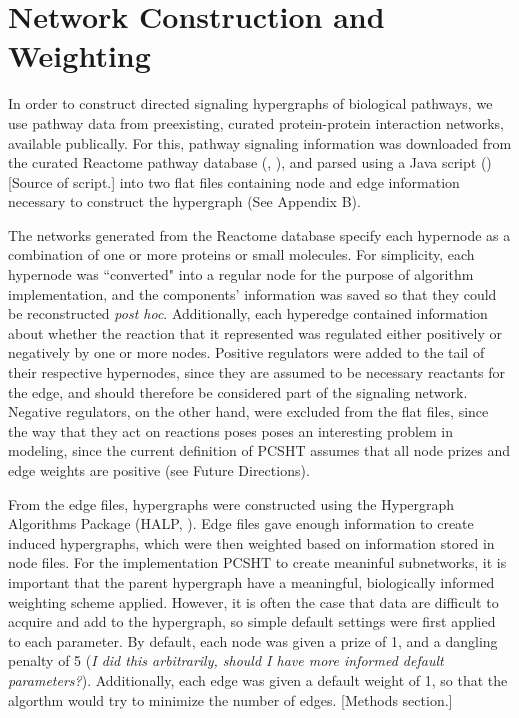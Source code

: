 \documentclass[12pt,twoside]{reedthesis}
\newcommand{\new}[2]{{\color{orange}#1 [#2]}}
\theoremstyle{definition}
\begin{document}
  \section{Network Construction and Weighting}
  In order to construct directed signaling hypergraphs of biological pathways, we use pathway data from preexisting, curated protein-protein interaction networks, available publically. For this, pathway signaling information was downloaded from the curated Reactome pathway database (\cite{Croft2014}, \cite{Milacic2012}), and parsed \new{using a Java script (\cite{AnnaCorrespondence})}{Source of script.} into two flat files containing node and edge information necessary to construct the hypergraph (See Appendix B).\par
  The networks generated from the Reactome database specify each hypernode as a combination of one or more proteins or small molecules. For simplicity, each hypernode was ``converted" into a regular node for the purpose of algorithm implementation, and the components' information was saved so that they could be reconstructed \textit{post hoc}. Additionally, each hyperedge contained information about whether the reaction that it represented was regulated either positively or negatively by one or more nodes. Positive regulators were added to the tail of their respective hypernodes, since they are assumed to be necessary reactants for the edge, and should therefore be considered part of the signaling network. Negative regulators, on the other hand, were excluded from the flat files, since the way that they act on reactions poses poses an interesting problem in modeling, since the current definition of PCSHT assumes that all node prizes and edge weights are positive (see Future Directions).\par
  \new{From the edge files, hypergraphs were constructed using the Hypergraph Algorithms Package (HALP, \cite{halp}). Edge files gave enough information to create induced hypergraphs, which were then weighted based on information stored in node files. For the implementation PCSHT to create meaninful subnetworks, it is important that the parent hypergraph have a meaningful, biologically informed weighting scheme applied. However, it is often the case that data are difficult to acquire and add to the hypergraph, so simple default settings were first applied to each parameter. By default, each node was given a prize of 1, and a dangling penalty of 5 (\emph{I did this arbitrarily, should I have more informed default parameters?}).  Additionally, each edge was given a default weight of 1, so that the algorthm would try to minimize the number of edges.}{Methods section.}
\end{document}
